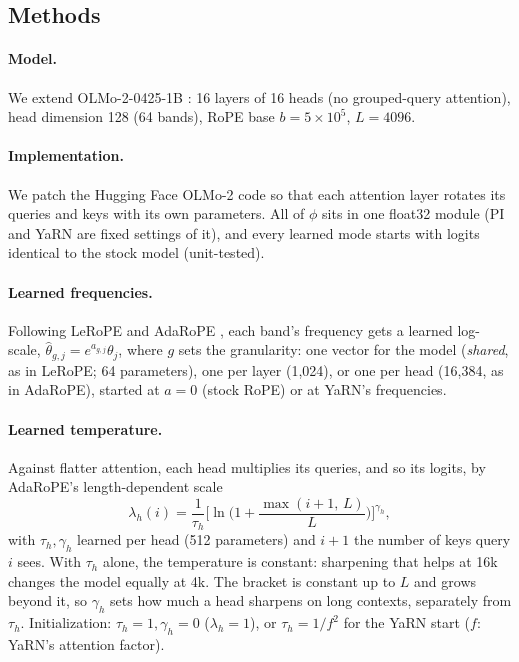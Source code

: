 \documentclass[11pt]{article}
\begin{document}
\subsection{Methods}
\label{sec:method}

\paragraph{Model.} We extend OLMo-2-0425-1B \citep{olmo2024olmo2}: 16 layers of 16 heads (no grouped-query attention), head dimension 128 (64 bands), RoPE base $b = 5\times10^5$, $L = 4096$.

\paragraph{Implementation.} We patch the Hugging Face OLMo-2 code \citep{wolf2020transformers} so that each attention layer rotates its queries and keys with its own parameters. All of $\phi$ sits in one float32 module (PI and YaRN are fixed settings of it), and every learned mode starts with logits identical to the stock model (unit-tested).



\paragraph{Learned frequencies.} Following LeRoPE \citep{karypis2026lerope} and AdaRoPE \citep{wang2026adarope}, each band's frequency gets a learned log-scale, $\hat\theta_{g,j} = e^{a_{g,j}}\theta_j$, where $g$ sets the granularity: one vector for the model (\emph{shared}, as in LeRoPE; 64 parameters), one per layer (1{,}024), or one per head (16{,}384, as in AdaRoPE), started at $a = 0$ (stock RoPE) or at YaRN's frequencies.

\paragraph{Learned temperature.} Against flatter attention, each head multiplies its queries, and so its logits, by AdaRoPE's
length-dependent scale
\begin{equation}
\lambda_h(i) = \frac{1}{\tau_h}\Big[\ln\Big(1 + \frac{\max(i+1,\,L)}{L}\Big)\Big]^{\gamma_h},
\end{equation}
with $\tau_h, \gamma_h$ learned per head (512 parameters) and $i+1$ the number of keys query $i$ sees. With $\tau_h$ alone, the temperature is constant: sharpening that helps at 16k changes the model equally at 4k. The bracket is constant up to $L$ and grows beyond it, so $\gamma_h$ sets how much a head sharpens on long contexts, separately from $\tau_h$. Initialization: $\tau_h = 1, \gamma_h = 0$ ($\lambda_h = 1$), or $\tau_h = 1/f^2$ for the YaRN start ($f$: YaRN's attention factor).
\end{document}
